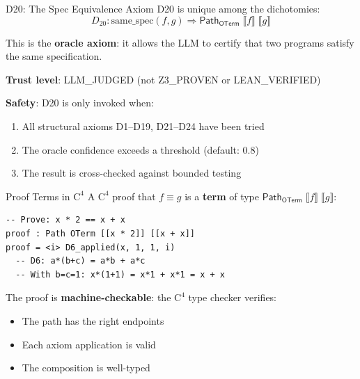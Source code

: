\documentclass[aspectratio=169,11pt]{beamer}
\newcommand{\Cfour}{\mathrm{C}^4}
\newcommand{\Path}{\mathsf{Path}}
\newcommand{\OTerm}{\mathsf{OTerm}}
\newcommand{\den}[1]{\llbracket #1 \rrbracket}
\begin{document}
\begin{frame}{D20: The Spec Equivalence Axiom}
D20 is unique among the dichotomies:
\[
D_{20} : \mathrm{same\_spec}(f, g) \Rightarrow \Path_\OTerm\;\den{f}\;\den{g}
\]

\vspace{0.5em}
This is the \textbf{oracle axiom}: it allows the LLM to certify that two programs satisfy the same specification.

\vspace{0.5em}
\textbf{Trust level}: LLM\_JUDGED (not Z3\_PROVEN or LEAN\_VERIFIED)

\vspace{0.5em}
\textbf{Safety}: D20 is only invoked when:
\begin{enumerate}
\item All structural axioms D1--D19, D21--D24 have been tried
\item The oracle confidence exceeds a threshold (default: 0.8)
\item The result is cross-checked against bounded testing
\end{enumerate}
\end{frame}

\begin{frame}{Proof Terms in $\Cfour$}
A $\Cfour$ proof that $f \equiv g$ is a \textbf{term} of type $\Path_\OTerm\;\den{f}\;\den{g}$:

\begin{lstlisting}[language=deppy, basicstyle=\small\ttfamily]
-- Prove: x * 2 == x + x
proof : Path OTerm [[x * 2]] [[x + x]]
proof = <i> D6_applied(x, 1, 1, i)
  -- D6: a*(b+c) = a*b + a*c
  -- With b=c=1: x*(1+1) = x*1 + x*1 = x + x
\end{lstlisting}

\vspace{0.5em}
The proof is \textbf{machine-checkable}: the $\Cfour$ type checker verifies:
\begin{itemize}
\item The path has the right endpoints
\item Each axiom application is valid
\item The composition is well-typed
\end{itemize}
\end{frame}
\end{document}

